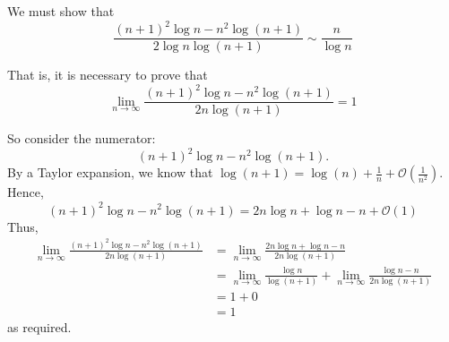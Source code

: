\documentclass{unswmaths}
\begin{document}
    We must show that
    \begin{equation*}
        \frac{(n+1)^2\log{n}-n^2\log(n+1)}{2\log{n}\log(n+1)} \sim \frac{n}{\log{n}}
    \end{equation*}
    
    That is, it is necessary to prove that
    \begin{equation*}
        \lim_{n\rightarrow\infty} \frac{(n+1)^2\log{n}-n^2\log(n+1)}{2n\log(n+1)} = 1
    \end{equation*}
    
    So consider the numerator:
    \begin{equation*}
        (n+1)^2\log{n}-n^2\log(n+1).
    \end{equation*}
    By a Taylor expansion, we know that $\log(n+1) = \log(n) + \frac{1}{n}+\mathcal{O}\left(\frac{1}{n^2}\right)$. Hence,
    \begin{equation*}
        (n+1)^2\log{n}-n^2\log(n+1) = 2n\log{n}+\log{n}-n+\mathcal{O}(1)
    \end{equation*}
    Thus,
    \begin{align*}
        \lim_{n\rightarrow\infty} \frac{(n+1)^2\log{n}-n^2\log(n+1)}{2n\log(n+1)} &= \lim_{n\rightarrow\infty} \frac{2n\log{n}+\log{n}-n}{2n\log{(n+1)}}\\
        &= \lim_{n\rightarrow\infty} \frac{\log{n}}{\log{(n+1)}}+\lim_{n\rightarrow\infty} \frac{\log{n}-n}{2n\log{(n+1)}}\\
        &= 1+0\\
        &= 1
    \end{align*}
    as required.
\end{document}
